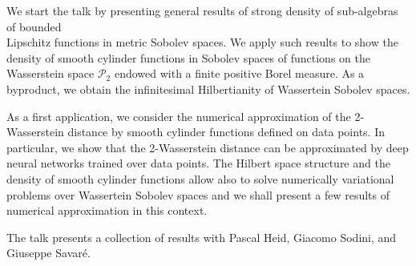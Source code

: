 \mypage
{}
\begin{myabstract}
We start the talk by presenting general results of strong density of sub-algebras of bounded\\\relax
Lipschitz functions in metric Sobolev spaces. We apply such results to show the density of smooth cylinder functions in Sobolev spaces of functions on the Wasserstein space \protect $\mathcal P_2$ endowed with a finite positive Borel measure. As a byproduct, we obtain the infinitesimal Hilbertianity of Wassertein Sobolev spaces.

As a first application, we consider the numerical approximation of the 2-Wasserstein distance by smooth cylinder functions defined on data points. In particular, we show that the 2-Wasserstein distance can be approximated by deep neural networks trained over data points. The Hilbert space structure and the density of smooth cylinder functions allow also to solve numerically variational problems over Wassertein Sobolev spaces and we shall present a few results of numerical approximation in this context.

The talk presents a collection of results with Pascal Heid, Giacomo Sodini, and Giuseppe Savaré.
\end{myabstract}
